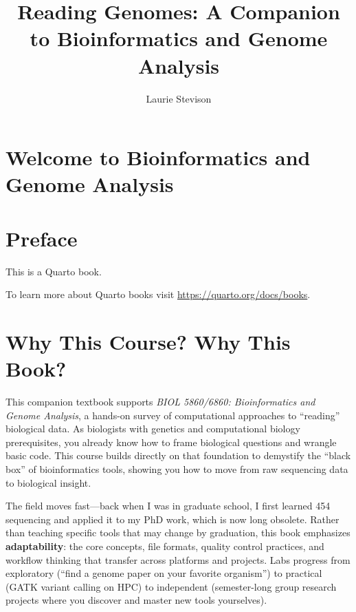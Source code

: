 \documentclass[
  letterpaper,
  DIV=11,
  numbers=noendperiod]{scrreprt}
\title{Reading Genomes: A Companion to Bioinformatics and Genome
Analysis}
\author{Laurie Stevison}
\date{}
\renewcommand*\contentsname{Table of contents}
\newcommand\contentsname{Table of contents}
\begin{document}
\maketitle

\renewcommand*\contentsname{Table of contents}
{
\hypersetup{linkcolor=}
\setcounter{tocdepth}{2}
\tableofcontents
}


\chapter{Welcome to Bioinformatics and Genome
Analysis}\label{welcome-to-bioinformatics-and-genome-analysis}


\chapter*{Preface}\label{preface}


This is a Quarto book.

To learn more about Quarto books visit
\url{https://quarto.org/docs/books}.


\chapter{Why This Course? Why This
Book?}\label{why-this-course-why-this-book}

This companion textbook supports \emph{BIOL 5860/6860: Bioinformatics
and Genome Analysis}, a hands-on survey of computational approaches to
``reading'' biological data. As biologists with genetics and
computational biology prerequisites, you already know how to frame
biological questions and wrangle basic code. This course builds directly
on that foundation to demystify the ``black box'' of bioinformatics
tools, showing you how to move from raw sequencing data to biological
insight.

The field moves fast---back when I was in graduate school, I first
learned 454 sequencing and applied it to my PhD work, which is now long
obsolete. Rather than teaching specific tools that may change by
graduation, this book emphasizes \textbf{adaptability}: the core
concepts, file formats, quality control practices, and workflow thinking
that transfer across platforms and projects. Labs progress from
exploratory (``find a genome paper on your favorite organism'') to
practical (GATK variant calling on HPC) to independent (semester-long
group research projects where you discover and master new tools
yourselves).
\end{document}
